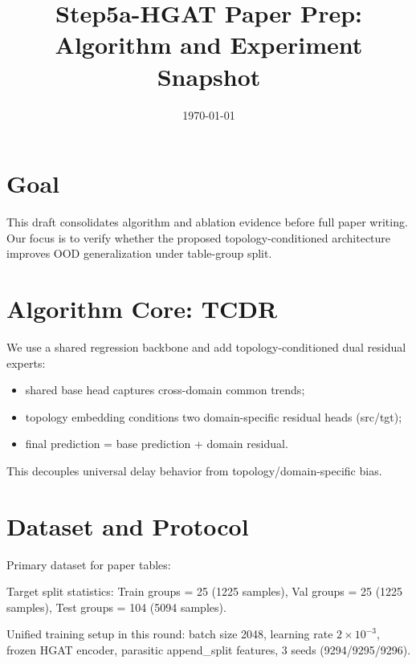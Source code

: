 \documentclass[11pt,a4paper]{article}
\title{Step5a-HGAT Paper Prep: Algorithm and Experiment Snapshot}
\author{}
\date{\today}
\begin{document}
\maketitle

\section{Goal}
This draft consolidates algorithm and ablation evidence before full paper writing.
Our focus is to verify whether the proposed topology-conditioned architecture improves OOD generalization under table-group split.

\section{Algorithm Core: TCDR}
We use a shared regression backbone and add topology-conditioned dual residual experts:
\begin{itemize}
  \item shared base head captures cross-domain common trends;
  \item topology embedding conditions two domain-specific residual heads (src/tgt);
  \item final prediction = base prediction + domain residual.
\end{itemize}

This decouples universal delay behavior from topology/domain-specific bias.

\section{Dataset and Protocol}
Primary dataset for paper tables:
\begin{center}
\end{center}

Target split statistics:
Train groups = 25 (1225 samples), Val groups = 25 (1225 samples), Test groups = 104 (5094 samples).

Unified training setup in this round:
batch size 2048, learning rate $2\times10^{-3}$, frozen HGAT encoder, parasitic append\_split features, 3 seeds (9294/9295/9296).
\end{document}
